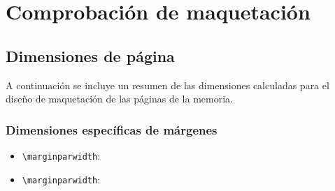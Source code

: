 \chapter{Comprobación de maquetación}
\label{app:dims}

\section{Dimensiones de página}

A continuación se incluye un resumen de las dimensiones calculadas para
el diseño de maquetación de las páginas de la memoria.


\pagediagram

\subsection{Dimensiones específicas de márgenes}

\begin{itemize}
    \item \verb|\marginparwidth|: \prntlen{\marginparwidth}
    
    \item \verb|\marginparwidth|: \prntlen{\marginparwidth}
\end{itemize}


